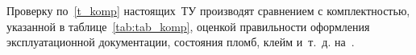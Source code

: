 Проверку по~\ref{t_komp} настоящих~ТУ производят  сравнением с комплектностью, указанной в таблице~\ref{tab:tab_komp}, оценкой правильности оформления эксплуатационной документации, состояния пломб, клейм и~т.~д. на~\dut.
